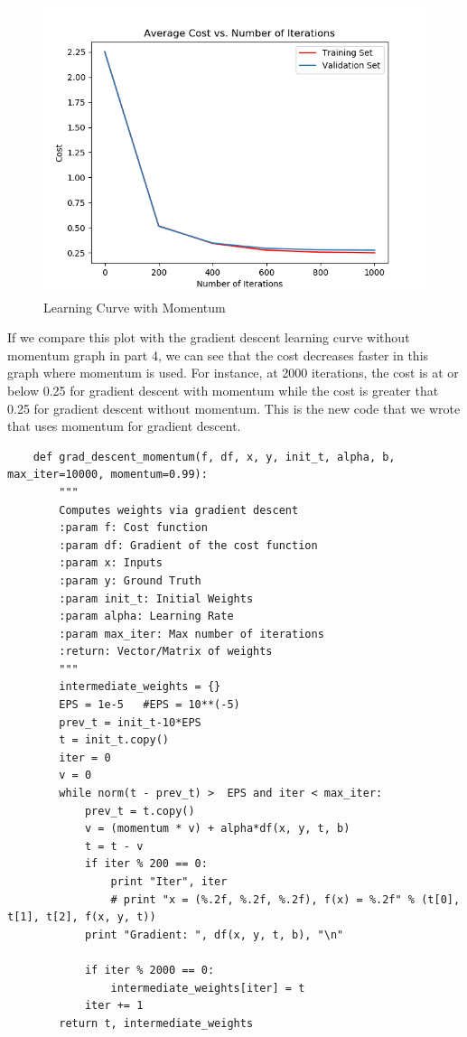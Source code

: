 \documentclass[10pt,letterpaper]{article}
\begin{document}
	\begin{figure}[H]
	    \centering
		\includegraphics[width=1.0\linewidth]{part_5_validation_training_plot.png}
		\caption{Learning Curve with Momentum}
		\label{fig:part5}
	\end{figure}

	If we compare this plot with the gradient descent learning curve without momentum graph in part 4, we can see that the cost decreases faster in this graph where momentum is used. For instance, at 2000 iterations, the cost is at or below 0.25 for gradient descent with momentum while the cost is greater that 0.25 for gradient descent without momentum.
	This is the new code that we wrote that uses momentum for gradient descent.
	\begin{lstlisting}
    def grad_descent_momentum(f, df, x, y, init_t, alpha, b, max_iter=10000, momentum=0.99):
        """
        Computes weights via gradient descent
        :param f: Cost function
        :param df: Gradient of the cost function
        :param x: Inputs
        :param y: Ground Truth
        :param init_t: Initial Weights
        :param alpha: Learning Rate
        :param max_iter: Max number of iterations
        :return: Vector/Matrix of weights
        """
        intermediate_weights = {}
        EPS = 1e-5   #EPS = 10**(-5)
        prev_t = init_t-10*EPS
        t = init_t.copy()
        iter = 0
        v = 0
        while norm(t - prev_t) >  EPS and iter < max_iter:
            prev_t = t.copy()
            v = (momentum * v) + alpha*df(x, y, t, b)
            t = t - v
            if iter % 200 == 0:
                print "Iter", iter
                # print "x = (%.2f, %.2f, %.2f), f(x) = %.2f" % (t[0], t[1], t[2], f(x, y, t))
            print "Gradient: ", df(x, y, t, b), "\n"

            if iter % 2000 == 0:
                intermediate_weights[iter] = t
            iter += 1
        return t, intermediate_weights
	\end{lstlisting}
\end{document}
